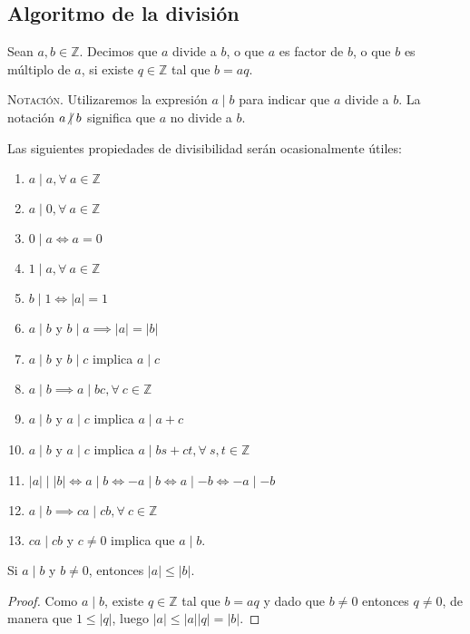 \subsection{Algoritmo de la división}

\begin{definition}
Sean $a,b\in \mathbb{Z}$. Decimos que $a$ divide a $b$, o que $a$ es factor de $b$, o que $b$ es múltiplo de $a$, si existe $q\in \mathbb{Z}$ tal que $b=aq$.
\end{definition}
\textsc{Notación}. Utilizaremos la expresión $a\mid b$ para indicar que $a$ divide a $b$. La notación $a\centernot\mid b$ significa que $a$ no divide a $b$.

\begin{proposition}
\label{prop:prop1}Las siguientes propiedades de divisibilidad serán ocasionalmente útiles:

\begin{enumerate}[label=\textnormal{(\roman*)}]
	\item $a\mid a, \forall \: a\in \mathbb{Z}$
	\item $a\mid 0,\forall \: a\in \mathbb{Z}$
	\item $0\mid a\iff a=0$
	\item $1\mid a,\forall \: a\in \mathbb{Z}$
	\item $b\mid 1\iff |a|=1$
	\item $a\mid b$ y $b\mid a\implies |a|=|b|$
	\item $a\mid b$ y $b\mid c$ implica $a\mid c$
	\item $a\mid b \implies a\mid bc,\forall \: c\in \mathbb{Z}$
	\item $a\mid b$ y $a\mid c$ implica $a\mid a+c$
	\item $a\mid b$ y $a\mid c$ implica $a\mid bs+c t,\forall \: s,t\in \mathbb{Z}$
	\item $|a|\mid |b| \iff a\mid b \iff -a\mid b \iff a\mid -b \iff -a\mid -b$
	\item $a\mid b \implies ca \mid c b,\forall \: c\in \mathbb{Z}$
	\item $c a \mid c b$ y $c\neq 0$ implica que $a \mid b$.
\end{enumerate}
\end{proposition}

\begin{proposition}
\label{prop:des1}Si $a\mid b$ y $b \neq 0$, entonces $|a|\leq|b|$.
\end{proposition}
\begin{proof}
Como $a \mid b$, existe $q\in \mathbb{Z}$ tal que $b=aq$ y dado que $b \neq 0$ entonces $q \neq 0$, de manera que $1\leq |q|$, luego $|a|\leq |a||q|=|b|$.
\end{proof}

